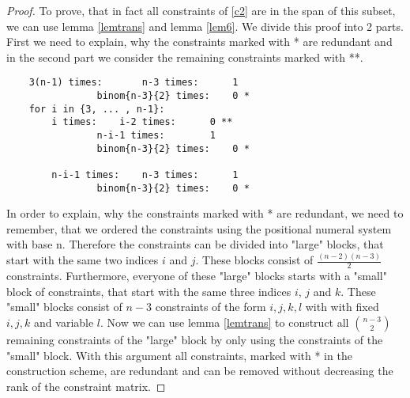 \documentclass{scrartcl}
\theoremstyle{plain}
\begin{document}
\begin{proof}
	To prove, that in fact all constraints of \eqref{c2} are in the span of this subset, we can use lemma \ref{lemtrans} and lemma \ref{lem6}. We divide this proof into 2 parts. First we need to explain, why the constraints marked with * are redundant and in the second part we consider the remaining constraints marked with **.
	
	\begin{lstlisting}
	3(n-1) times: 		n-3 times:		1
				binom{n-3}{2} times:	0 *
	for i in {3, ... , n-1}:
		i times:	i-2 times:		0 **
				n-i-1 times:		1
				binom{n-3}{2} times:	0 *
	
		n-i-1 times: 	n-3 times:		1
				binom{n-3}{2} times:	0 *
	\end{lstlisting}
	
	
	In order to explain, why the constraints marked with * are redundant, we need to remember, that we ordered the constraints using the positional numeral system with base n. Therefore the constraints can be divided into "large" blocks, that start with the same two indices $i$ and $j$. These blocks consist of $\frac{(n-2)(n-3)}{2}$ constraints.
	Furthermore, everyone of these "large" blocks starts with a "small" block of constraints, that start with the same three indices $i$, $j$ and $k$. These "small" blocks consist of $n-3$ constraints of the form $i,j,k,l$ with with fixed $i,j,k$ and variable $l$. Now we can use lemma \ref{lemtrans} to construct all $\binom{n-3}{2}$ remaining constraints of the "large" block by only using the constraints of the "small" block. With this argument all constraints, marked with * in the construction scheme, are redundant and can be removed without decreasing the rank of the constraint matrix.
	

\end{proof}
\end{document}
